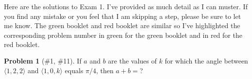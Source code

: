\documentclass{article}
\theoremstyle{plain}
\theoremstyle{definition}
\newtheorem{problem}[exercise]{Problem}
\theoremstyle{remark}
\begin{document}
\author{TA: \href{mailto:\authoremail}{\documentauthor}}
\title{\documenttitle}
\date{\today}
\maketitle
Here are the solutions to Exam 1. I've provided as much detail as I can
muster. If you find any mistake or you feel that I am skipping a step,
please be sure to let me know. The {\color{Green}green booklet} and
{\color{Red}red booklet} are similar so I've highlighted the corresponding
problem number in {\color{Green}green} for the {\color{Green}green booklet}
and in {\color{Red}red} for the {\color{Red}red booklet}.

\begin{problem}[{\color{Green}\#1}, {\color{Red}\#11}]
If $a$ and $b$ are the values of $k$ for which the angle between $\langle
1,2,2 \rangle$ and $\langle 1,0,k \rangle$ equals $\pi/4$, then $a+b=$?
\end{problem}
\end{document}
